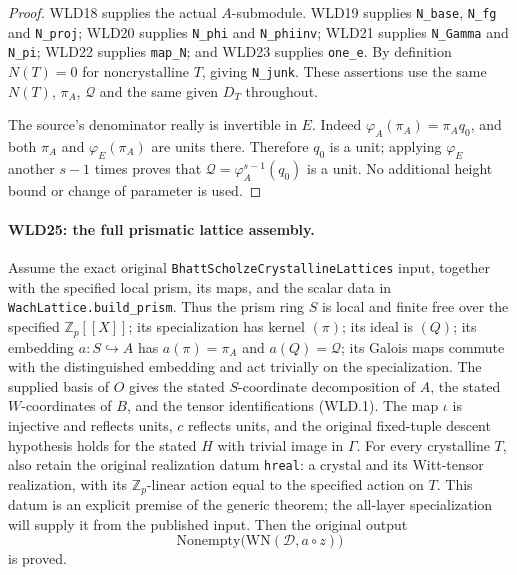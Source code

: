 \begin{proof}
WLD18 supplies the actual $A$-submodule. WLD19 supplies
\texttt{N\_\allowbreak base}, \texttt{N\_\allowbreak fg} and \texttt{N\_\allowbreak proj};
WLD20 supplies \texttt{N\_\allowbreak phi} and \texttt{N\_\allowbreak phiinv};
WLD21 supplies \texttt{N\_\allowbreak Gamma} and \texttt{N\_\allowbreak pi};
WLD22 supplies \texttt{map\_\allowbreak N}; and WLD23 supplies
\texttt{one\_\allowbreak e}. By definition $N(T)=0$ for noncrystalline
$T$, giving \texttt{N\_\allowbreak junk}. These assertions use the same
$N(T)$, $\pi_A$, $\mathcal Q$ and the same given $D_T$ throughout.

The source's denominator really is invertible in $E$. Indeed
$\varphi_A(\pi_A)=\pi_Aq_0$, and both $\pi_A$ and
$\varphi_E(\pi_A)$ are units there. Therefore $q_0$ is a unit;
applying $\varphi_E$ another $s-1$ times proves that
$\mathcal Q=\varphi_A^{s-1}(q_0)$ is a unit. No additional
height bound or change of parameter is used.
\end{proof}

\paragraph{WLD25: the full prismatic lattice assembly.}
\label{claim:WLD25}
Assume the exact original
\texttt{Bhatt\allowbreak Scholze\allowbreak Crystalline\allowbreak Lattices} input, together with the
specified local prism, its maps, and the scalar data in
\texttt{Wach\allowbreak Lattice.\allowbreak build\_\allowbreak prism}. Thus the prism ring $S$ is local
and finite free over the specified $\mathbb Z_p[[X]]$; its
specialization has kernel $(\pi)$; its ideal is $(Q)$; its
embedding $a:S\hookrightarrow A$ has $a(\pi)=\pi_A$ and
$a(Q)=\mathcal Q$; its Galois maps commute with the distinguished
embedding and act trivially on the specialization. The supplied
basis of $O$ gives the stated $S$-coordinate decomposition of
$A$, the stated $W$-coordinates of $B$, and the tensor
identifications (WLD.1). The map $\iota$ is injective and reflects
units, $c$ reflects units, and the original fixed-tuple descent
hypothesis holds for the stated $H$ with trivial image in $\Gamma$.
For every crystalline $T$, also retain the original realization
datum \texttt{hreal}: a crystal and its Witt-tensor realization,
with its $\mathbb Z_p$-linear action equal to the specified action
on $T$. This datum is an explicit premise of the generic theorem;
the all-layer specialization will supply it from the published input.
Then the original output
\[
                         \mathrm{Nonempty}\bigl(
                         \mathrm{WN}(\mathcal D,a\circ z)\bigr)
                                                               \tag{WLD.26}
\]
is proved.

